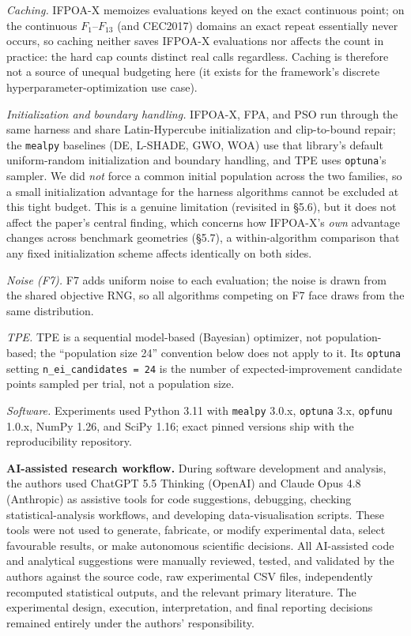 \documentclass[preprint,12pt]{elsarticle}
\begin{document}
\emph{Caching.} IFPOA-X memoizes evaluations keyed on the exact continuous point; on the continuous $F_1$--$F_{13}$ (and CEC2017) domains an exact repeat essentially never occurs, so caching neither saves IFPOA-X evaluations nor affects the count in practice: the hard cap counts distinct real calls regardless. Caching is therefore not a source of unequal budgeting here (it exists for the framework's discrete hyperparameter-optimization use case).

\emph{Initialization and boundary handling.} IFPOA-X, FPA, and PSO run through the same harness and share Latin-Hypercube initialization and clip-to-bound repair; the \texttt{mealpy} baselines (DE, L-SHADE, GWO, WOA) use that library's default uniform-random initialization and boundary handling, and TPE uses \texttt{optuna}'s sampler. We did \emph{not} force a common initial population across the two families, so a small initialization advantage for the harness algorithms cannot be excluded at this tight budget. This is a genuine limitation (revisited in \S5.6), but it does not affect the paper's central finding, which concerns how IFPOA-X's \emph{own} advantage changes across benchmark geometries (\S5.7), a within-algorithm comparison that any fixed initialization scheme affects identically on both sides.

\emph{Noise (F7).} F7 adds uniform noise to each evaluation; the noise is drawn from the shared objective RNG, so all algorithms competing on F7 face draws from the same distribution.

\emph{TPE.} TPE is a sequential model-based (Bayesian) optimizer, not population-based; the ``population size 24'' convention below does not apply to it. Its \texttt{optuna} setting \texttt{n\_ei\_candidates = 24} is the number of expected-improvement candidate points sampled per trial, not a population size.

\emph{Software.} Experiments used Python 3.11 with \texttt{mealpy} 3.0.x, \texttt{optuna} 3.x, \texttt{opfunu} 1.0.x, NumPy 1.26, and SciPy 1.16; exact pinned versions ship with the reproducibility repository.

\textbf{AI-assisted research workflow.} During software development and analysis, the authors used ChatGPT 5.5 Thinking (OpenAI) and Claude Opus 4.8 (Anthropic) as assistive tools for code suggestions, debugging, checking statistical-analysis workflows, and developing data-visualisation scripts. These tools were not used to generate, fabricate, or modify experimental data, select favourable results, or make autonomous scientific decisions. All AI-assisted code and analytical suggestions were manually reviewed, tested, and validated by the authors against the source code, raw experimental CSV files, independently recomputed statistical outputs, and the relevant primary literature. The experimental design, execution, interpretation, and final reporting decisions remained entirely under the authors' responsibility.
\end{document}

